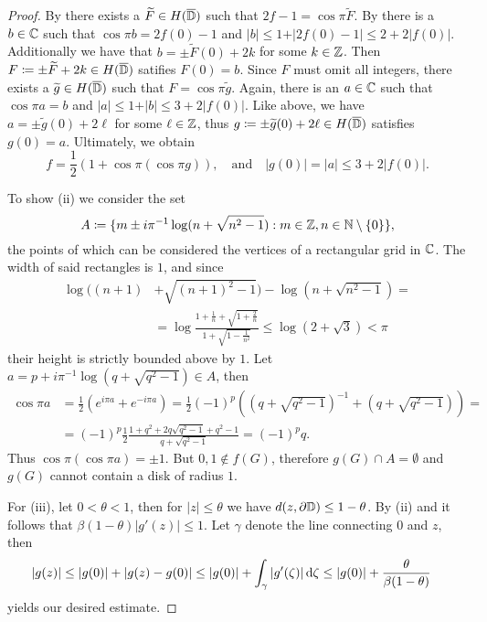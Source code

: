 \begin{proof}
    By  there exists a $\widetilde{F} \in H(\overline{\mathbb{D}})$ such that $2f - 1 = \cos \pi \widetilde{F}$. By  there is a $b \in \mathbb{C}$ such that $\cos \pi b = 2f(0) - 1$ and $\vert b \vert \leq 1 + \vert 2 f(0) - 1 \vert \leq 2 + 2 \vert f(0) \vert$. Additionally we have that $b = \pm \widetilde{F}(0) + 2k$ for some $k \in \mathbb{Z}$. Then $F \coloneqq \pm \widetilde{F} + 2k \in H(\overline{\mathbb{D}})$ satifies $F(0) = b$. Since $F$ must omit all integers, there exists a $\widetilde{g} \in H(\overline{\mathbb{D}})$ such that $F = \cos \pi \widetilde{g}$. Again, there is an $a \in \mathbb{C}$ such that $\cos \pi a = b$ and $\vert a \vert \leq 1 + \vert b \vert \leq 3 + 2 \vert f(0) \vert$. Like above, we have $a = \pm \widetilde{g}(0) + 2\ell$ for some $\ell \in \mathbb{Z}$, thus $g \coloneqq \pm \widetilde{g}(0) + 2\ell \in H(\overline{\mathbb{D}})$ satisfies $g(0) = a$. Ultimately, we obtain
    $$ \textstyle f = \frac{1}{2} (1 + \cos \pi (\cos \pi g)), \quad \textrm{and} \quad \vert g(0) \vert = \vert a \vert \leq 3 + 2 \vert f(0) \vert. $$

    To show (ii) we consider the set
    $$ A \coloneqq \{ m \pm i \pi^{-1} \log (n + \sqrt{n^2 - 1}) : m \in \mathbb{Z}, n \in \mathbb{N} \setminus \{ 0 \} \}, $$
    the points of which can be considered the vertices of a rectangular grid in $\mathbb{C}$. The width of said rectangles is $1$, and since
    \begin{align*}
        \log ((n+1) &+ \sqrt{(n+1)^2 - 1}) - \log (n + \sqrt{n^2 - 1}) = \\
        &= \log \frac{1 + \frac{1}{n} + \sqrt{1 + \frac{2}{n}}}{1 + \sqrt{1 - \frac{1}{n^2}}} \leq \log (2 + \sqrt{3}) < \pi
    \end{align*}
    their height is strictly bounded above by $1$. Let $a = p + i \pi^{-1} \log(q + \sqrt{q^2 - 1}) \in A$, then
    \begin{align*}
        \cos \pi a &= {\textstyle\frac{1}{2}}( e^{i \pi a} + e^{-i \pi a}) = {\textstyle\frac{1}{2}} (-1)^p ((q + \sqrt{q^2 - 1})^{-1} + (q + \sqrt{q^2 - 1})) = \\
        &= (-1)^p \frac{1}{2} \frac{1 + q^2 + 2q \sqrt{q^2 - 1} + q^2 - 1}{q + \sqrt{q^2 - 1}} = (-1)^p q.
    \end{align*}
    Thus $\cos \pi (\cos \pi a) = \pm 1$. But $0, 1 \notin f(G)$, therefore $g(G) \cap A = \emptyset$ and $g(G)$ cannot contain a disk of radius $1$.

    For (iii), let $0 < \theta < 1$, then for $\vert z \vert \leq \theta$ we have $d(z, \partial \mathbb{D}) \leq 1 - \theta$. By (ii) and  it follows that $\beta (1 - \theta) \vert g'(z) \vert \leq 1$. Let $\gamma$ denote the line connecting $0$ and $z$, then
    \begin{align*}
        \vert g(z) \vert &\leq \vert g(0) \vert + \vert g(z) - g(0) \vert \leq \vert g(0) \vert + \int_\gamma \vert g'(\zeta) \vert \mathop{}\!\mathrm{d} \zeta \leq \vert g(0) \vert + \frac{\theta}{\beta (1 - \theta)}
    \end{align*}
    yields our desired estimate.
\end{proof}

